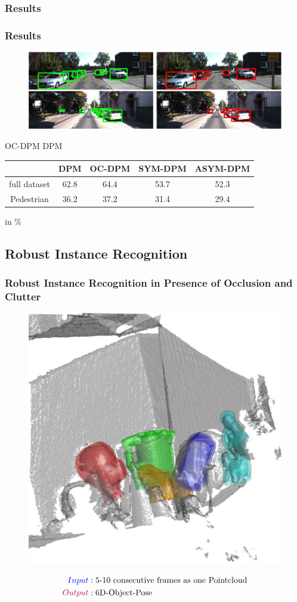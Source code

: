 \documentclass[xcolor=dvipsnames]{beamer}
\begin{document}
\subsubsection{Results}
\begin{frame}
	\frametitle{Results}
	\begin{figure}
		\includegraphics[width=\textwidth]{img/dpmoc_1.png}
	\end{figure}
	
	OC-DPM \hfill DPM
	\vspace{0.3cm}
	\begin{tabular}{c|c|c|c|c}
	    & DPM & OC-DPM & SYM-DPM & ASYM-DPM \\
		\hline
		full dataset & 62.8 & 64.4 & 53.7 & 52.3 \\
		Pedestrian & 36.2 & 37.2 & 31.4 & 29.4 \\
	\end{tabular}
	\begin{center}
		in $\%$
	\end{center}
\end{frame}

\subsection{Robust Instance Recognition}
{ 
\begin{frame}
	\frametitle{Robust Instance Recognition in Presence of Occlusion and Clutter}	
	\begin{figure}
		\includegraphics[width=.5\textwidth]{img/p3h1.png}
	\end{figure}
	
	\begin{align*}
		\textcolor{blue}{Input}&:  \text{5-10 consecutive frames as one Pointcloud} \\
		\textcolor{purple}{Output}&: \text{6D-Object-Pose}
	\end{align*}
\end{frame}}
\end{document}
